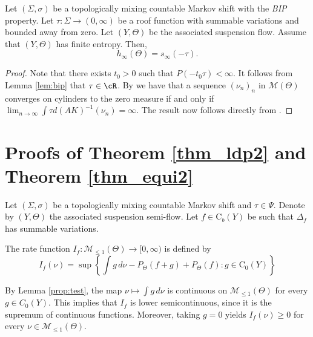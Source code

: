 \documentclass[letterpaper,11pt]{amsart}
\numberwithin{equation}{section}     %
\newcommand{\M}{\mathcal{M}}
\def\M{{\mathcal M}}
\def\le{\leqslant}
\def\ge{\geqslant}
\def\M{\mathcal{M}}
\begin{document}
\begin{lemma}\label{lem:entropyinf}
Let $(\Sigma, \sigma)$ be a topologically mixing countable Markov shift with the \emph{BIP} property. Let $\tau:\Sigma\to(0,\infty)$ be a roof function with summable variations and bounded away from zero. Let $(Y,\Theta)$ be the associated suspension flow. Assume that $(Y,\Theta)$ has finite entropy. Then, $$h_\infty(\Theta)=s_\infty(-\tau).$$
\end{lemma}
\begin{proof}
Note that there exists $t_0>0$ such that $P(-t_0\tau)<\infty$. It follows from Lemma \ref{lem:bip} that $\tau\in\cR$. By \cite[Lemma 6.9]{iv} 
we have that a sequence $(\nu_n)_n$ in $\M(\Theta)$ converges on cylinders to the zero measure if and only if $\lim_{n\to\infty}\int \tau d (AK)^{-1}(\nu_n)=\infty$. The result now follows directly from \cite[Theorem 3.7]{irv}. 
\end{proof}















\section{Proofs of Theorem \ref{thm_ldp2} and Theorem \ref{thm_equi2}}

Let $(\Sigma,\sigma)$ be a topologically mixing countable Markov shift and  $\tau\in\Psi$. Denote by  $(Y,\Theta)$  the associated suspension semi-flow. Let $f\in \mathrm{C}_b(Y)$ be such that $\Delta_f$ has summable variations. 

\begin{definition} 
The rate function $I_f:\M_{\leq 1}(\Theta) \to [0,\infty)$ is defined by
\begin{equation*}
I_f(\nu)= \sup \left\{ \int g\, d \nu -P_\Theta(f+g)  +P_\Theta(f) : g \in \mathrm{C}_0(Y)	\right\}
\end{equation*}
\end{definition}

By Lemma \ref{prop:test}, the map $\nu \mapsto \int g \, d\nu$ is continuous on $\M_{\le 1}(\Theta)$ for every $g \in C_0(Y)$. This implies that $I_f$ is lower semicontinuous, since it is the supremum of continuous functions. Moreover, taking $g = 0$ yields $I_f(\nu) \ge 0$ for every $\nu \in \M_{\le 1}(\Theta)$.
\end{document}
